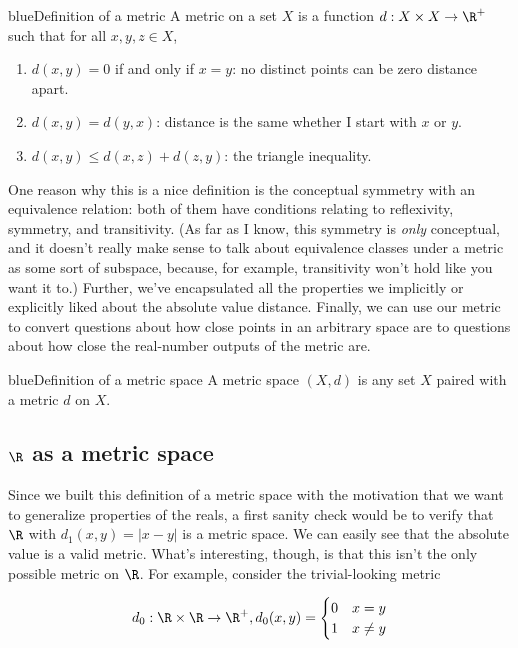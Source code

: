 \documentclass[./analysis.tex]{subfiles}
\begin{document}
    \begin{mycolorbox}{blue}{Definition of a metric}
        A metric on a set $X$ is a function $d: X \times X \to \R^+$ such that for all $x, y, z \in X$,

        \begin{enumerate}
            \item $d(x, y) = 0$ if and only if $x = y$: no distinct points can be zero distance apart.
            \item $d(x, y) = d(y, x)$: distance is the same whether I start with $x$ or $y$.
            \item $d(x, y) \leq d(x, z) + d(z, y)$: the triangle inequality.
        \end{enumerate}
    \end{mycolorbox}
    
    One reason why this is a nice definition is the conceptual symmetry with an equivalence relation: both of them have conditions relating to reflexivity, symmetry, and transitivity. (As far as I know, this symmetry is \emph{only} conceptual, and it doesn't really make sense to talk about equivalence classes under a metric as some sort of subspace, because, for example, transitivity won't hold like you want it to.) Further, we've encapsulated all the properties we implicitly or explicitly liked about the absolute value distance. Finally, we can use our metric to convert questions about how close points in an arbitrary space are to questions about how close the real-number outputs of the metric are.

    \begin{mycolorbox}{blue}{Definition of a metric space}
        A metric space $(X, d)$ is any set $X$ paired with a metric $d$ on $X$.
    \end{mycolorbox}
    
    \subsection{$\R$ as a metric space}

    Since we built this definition of a metric space with the motivation that we want to generalize properties of the reals, a first sanity check would be to verify that $\R$ with $d_1(x, y) = |x - y|$ is a metric space. We can easily see that the absolute value is a valid metric. What's interesting, though, is that this isn't the only possible metric on $\R$. For example, consider the trivial-looking metric

    \begin{align*}
        d_0: \R \times \R \to \R^+, d_0(x, y) = \begin{cases} 0 & x = y \\ 1 & x \neq y \end{cases}
    \end{align*}
\end{document}
